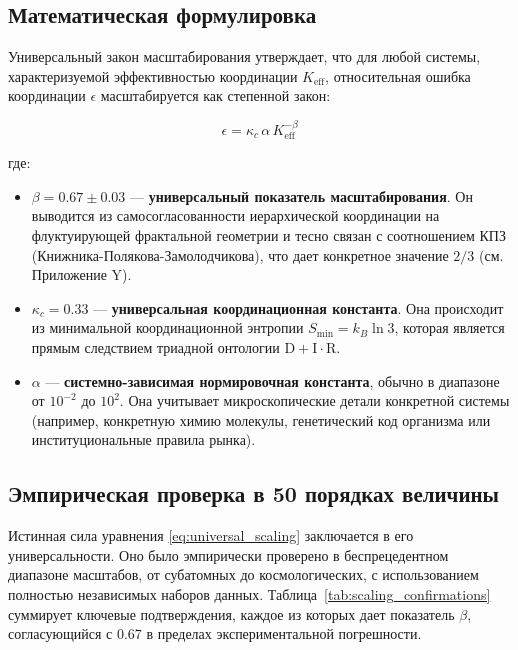 \documentclass[11pt,a4paper]{article}
\begin{document}
	\subsection{Математическая формулировка}
	
	Универсальный закон масштабирования утверждает, что для любой системы, характеризуемой эффективностью координации \(K_{\mathrm{eff}}\), относительная ошибка координации \(\epsilon\) масштабируется как степенной закон:
	
	\begin{equation}
		\boxed{\epsilon = \kappa_c \, \alpha \, K_{\mathrm{eff}}^{-\beta}}
		\label{eq:universal_scaling}
	\end{equation}
	
	где:
	\begin{itemize}
		\item \(\beta = 0.67 \pm 0.03\) — \textbf{универсальный показатель масштабирования}. Он выводится из самосогласованности иерархической координации на флуктуирующей фрактальной геометрии и тесно связан с соотношением КПЗ (Книжника-Полякова-Замолодчикова), что дает конкретное значение \(2/3\) (см. Приложение Y).
		\item \(\kappa_c = 0.33\) — \textbf{универсальная координационная константа}. Она происходит из минимальной координационной энтропии \(S_{\mathrm{min}} = k_B \ln 3\), которая является прямым следствием триадной онтологии \(\mathrm{D}+\mathrm{I}\cdot\mathrm{R}\).
		\item \(\alpha\) — \textbf{системно-зависимая нормировочная константа}, обычно в диапазоне от \(10^{-2}\) до \(10^2\). Она учитывает микроскопические детали конкретной системы (например, конкретную химию молекулы, генетический код организма или институциональные правила рынка).
	\end{itemize}
	
	\subsection{Эмпирическая проверка в 50 порядках величины}
	
	Истинная сила уравнения \eqref{eq:universal_scaling} заключается в его универсальности. Оно было эмпирически проверено в беспрецедентном диапазоне масштабов, от субатомных до космологических, с использованием полностью независимых наборов данных. Таблица~\ref{tab:scaling_confirmations} суммирует ключевые подтверждения, каждое из которых дает показатель \(\beta\), согласующийся с \(0.67\) в пределах экспериментальной погрешности.
	
\end{document}
